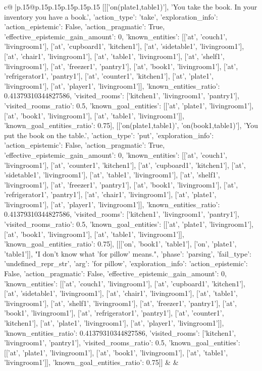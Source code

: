 \documentclass{article}
\begin{document}
{\begin{supertabular}{c@{$\;$}|p{.15\linewidth}@{}p{.15\linewidth}p{.15\linewidth}p{.15\linewidth}p{.15\linewidth}p{.15\linewidth}}
{{{	 [[['on(plate1,table1)'], 'You take the book. In your inventory you have a book.', {'action_type': 'take', 'exploration_info': {'action_epistemic': False, 'action_pragmatic': True, 'effective_epistemic_gain_amount': 0, 'known_entities': [['at', 'couch1', 'livingroom1'], ['at', 'cupboard1', 'kitchen1'], ['at', 'sidetable1', 'livingroom1'], ['at', 'chair1', 'livingroom1'], ['at', 'table1', 'livingroom1'], ['at', 'shelf1', 'livingroom1'], ['at', 'freezer1', 'pantry1'], ['at', 'book1', 'livingroom1'], ['at', 'refrigerator1', 'pantry1'], ['at', 'counter1', 'kitchen1'], ['at', 'plate1', 'livingroom1'], ['at', 'player1', 'livingroom1']], 'known_entities_ratio': 0.41379310344827586, 'visited_rooms': ['kitchen1', 'livingroom1', 'pantry1'], 'visited_rooms_ratio': 0.5, 'known_goal_entities': [['at', 'plate1', 'livingroom1'], ['at', 'book1', 'livingroom1'], ['at', 'table1', 'livingroom1']], 'known_goal_entities_ratio': 0.75}}], [['on(plate1,table1)', 'on(book1,table1)'], 'You put the book on the table.', {'action_type': 'put', 'exploration_info': {'action_epistemic': False, 'action_pragmatic': True, 'effective_epistemic_gain_amount': 0, 'known_entities': [['at', 'couch1', 'livingroom1'], ['at', 'counter1', 'kitchen1'], ['at', 'cupboard1', 'kitchen1'], ['at', 'sidetable1', 'livingroom1'], ['at', 'table1', 'livingroom1'], ['at', 'shelf1', 'livingroom1'], ['at', 'freezer1', 'pantry1'], ['at', 'book1', 'livingroom1'], ['at', 'refrigerator1', 'pantry1'], ['at', 'chair1', 'livingroom1'], ['at', 'plate1', 'livingroom1'], ['at', 'player1', 'livingroom1']], 'known_entities_ratio': 0.41379310344827586, 'visited_rooms': ['kitchen1', 'livingroom1', 'pantry1'], 'visited_rooms_ratio': 0.5, 'known_goal_entities': [['at', 'plate1', 'livingroom1'], ['at', 'book1', 'livingroom1'], ['at', 'table1', 'livingroom1']], 'known_goal_entities_ratio': 0.75}}], [[['on', 'book1', 'table1'], ['on', 'plate1', 'table1']], "I don't know what 'for pillow' means.", {'phase': 'parsing', 'fail_type': 'undefined_repr_str', 'arg': 'for pillow', 'exploration_info': {'action_epistemic': False, 'action_pragmatic': False, 'effective_epistemic_gain_amount': 0, 'known_entities': [['at', 'couch1', 'livingroom1'], ['at', 'cupboard1', 'kitchen1'], ['at', 'sidetable1', 'livingroom1'], ['at', 'chair1', 'livingroom1'], ['at', 'table1', 'livingroom1'], ['at', 'shelf1', 'livingroom1'], ['at', 'freezer1', 'pantry1'], ['at', 'book1', 'livingroom1'], ['at', 'refrigerator1', 'pantry1'], ['at', 'counter1', 'kitchen1'], ['at', 'plate1', 'livingroom1'], ['at', 'player1', 'livingroom1']], 'known_entities_ratio': 0.41379310344827586, 'visited_rooms': ['kitchen1', 'livingroom1', 'pantry1'], 'visited_rooms_ratio': 0.5, 'known_goal_entities': [['at', 'plate1', 'livingroom1'], ['at', 'book1', 'livingroom1'], ['at', 'table1', 'livingroom1']], 'known_goal_entities_ratio': 0.75}}]] 
	  } 
	   } 
	   } 
	 & & \\ 
 


\end{supertabular}}
\end{document}
